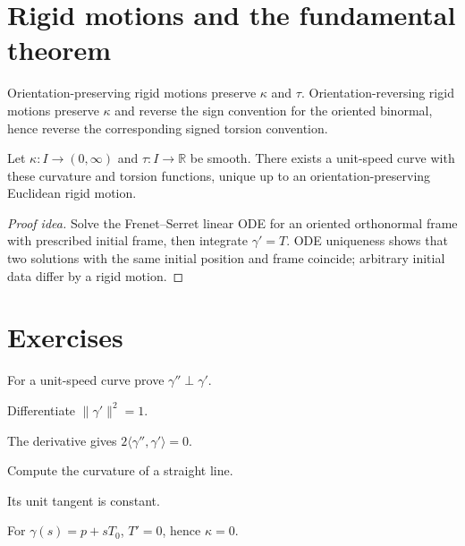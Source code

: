 \section{Rigid motions and the fundamental theorem}
\begin{proposition}\label{prop:vii13-rigid-invariance}
Orientation-preserving rigid motions preserve \(\kappa\) and \(\tau\).  Orientation-reversing rigid motions preserve \(\kappa\) and reverse the sign convention for the oriented binormal, hence reverse the corresponding signed torsion convention.
\end{proposition}

\begin{theorem}\label{thm:vii13-fundamental-curves}
Let \(\kappa:I\to(0,\infty)\) and \(\tau:I\to\mathbb R\) be smooth.  There exists a unit-speed curve with these curvature and torsion functions, unique up to an orientation-preserving Euclidean rigid motion.
\end{theorem}
\begin{proof}[Proof idea]
Solve the Frenet--Serret linear ODE for an oriented orthonormal frame with prescribed initial frame, then integrate \(\gamma'=T\).  ODE uniqueness shows that two solutions with the same initial position and frame coincide; arbitrary initial data differ by a rigid motion.
\end{proof}

\section{Exercises}
\begin{exercise}\label{exr:vii13-01}
For a unit-speed curve prove \(\gamma''\perp\gamma'\).
\end{exercise}
\begin{hint}
Differentiate \(\|\gamma'\|^2=1\).
\end{hint}
\begin{solution}
The derivative gives \(2\langle\gamma'',\gamma'\rangle=0\).
\end{solution}

\begin{exercise}\label{exr:vii13-02}
Compute the curvature of a straight line.
\end{exercise}
\begin{hint}
Its unit tangent is constant.
\end{hint}
\begin{solution}
For \(\gamma(s)=p+sT_0\), \(T'=0\), hence \(\kappa=0\).
\end{solution}

